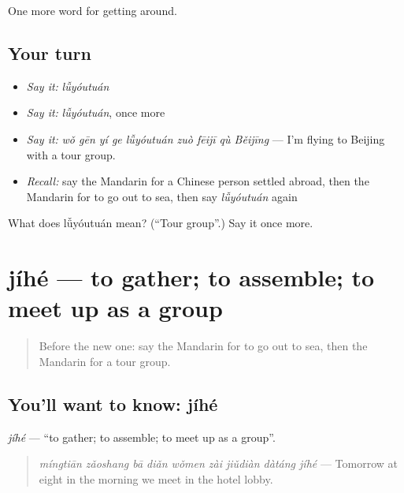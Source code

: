 \begin{grammarlens}[title={What you've built}]
One more word for getting around.
\end{grammarlens}

\subsection*{Your turn}
\begin{itemize}
\raggedright
  \item \emph{Say it:} \emph{lǚyóutuán}
  \item \emph{Say it:} \emph{lǚyóutuán}, once more
  \item \emph{Say it:} \emph{wǒ gēn yí ge lǚyóutuán zuò fēijī qù Běijīng} — I'm flying to Beijing with a tour group.
  \item \emph{Recall:} say the Mandarin for a Chinese person settled abroad, then the Mandarin for to go out to sea, then say \emph{lǚyóutuán} again
\end{itemize}

\begin{tcolorbox}[breakable,colback=teal!4,colframe=teal!35!black,title={Before you move on}]
What does lǚyóutuán mean? (\textquotedblleft{}Tour group\textquotedblright{}.) Say it once more.
\end{tcolorbox}
\section[jíhé]{jíhé — to gather; to assemble; to meet up as a group}

\label{lesson:ZH-C434-jihe}



\begin{quote}
Before the new one: say the Mandarin for to go out to sea, then the Mandarin for a tour group.
\end{quote}

\subsection*{You'll want to know: jíhé}
\emph{jíhé} — \textquotedblleft{}to gather; to assemble; to meet up as a group\textquotedblright{}.

\begin{quote}
\emph{míngtiān zǎoshang bā diǎn wǒmen zài jiǔdiàn dàtáng jíhé} — Tomorrow at eight in the morning we meet in the hotel lobby.
\end{quote}

